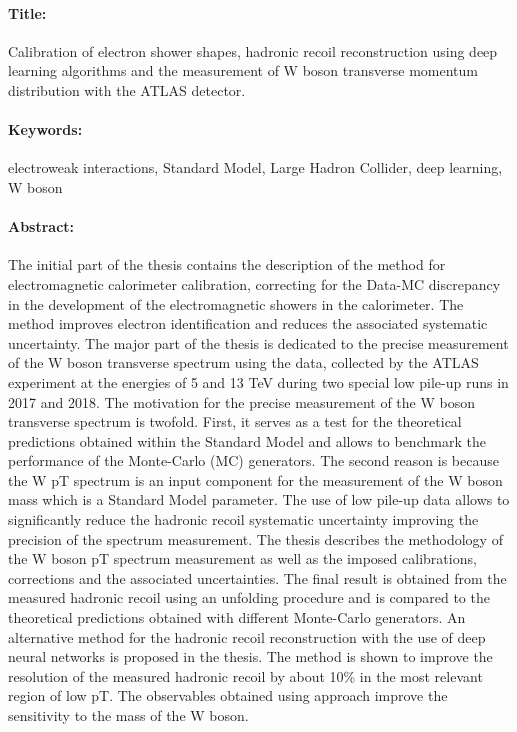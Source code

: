 \begin{mdframed}[linecolor=Prune,linewidth=1]
\vspace{-.25cm}
\paragraph*{Title:} Calibration of electron shower shapes, hadronic recoil reconstruction using deep learning algorithms and the measurement of W boson transverse momentum distribution with the ATLAS detector.

\begin{small}
\vspace{-.25cm}
\paragraph*{Keywords:} electroweak interactions, Standard Model, Large Hadron Collider, deep learning, W boson

\vspace{-.5cm}
\begin{multicols}{2}
\paragraph*{Abstract:} The initial part of the thesis contains the description of the method for electromagnetic calorimeter calibration, correcting for the Data-MC discrepancy in the development of the electromagnetic showers in the calorimeter. The method improves electron identification and reduces the associated systematic uncertainty. 
The major part of the thesis is dedicated to the precise measurement of the W boson transverse spectrum using the data, collected by the ATLAS experiment at the energies of 5 and 13 TeV during two special low pile-up runs in 2017 and 2018. 
The motivation for the precise measurement of the W boson transverse spectrum is twofold. First, it serves as a test for the theoretical predictions obtained within the Standard Model and allows to benchmark the performance of the Monte-Carlo (MC) generators. The second reason is because the W pT spectrum is an input component for the measurement of the W boson mass which is a Standard Model parameter. The use of low pile-up data allows to significantly reduce the hadronic recoil systematic uncertainty improving the precision of the spectrum measurement.
The thesis describes the methodology of the W boson pT spectrum measurement as well as the imposed calibrations, corrections and the associated uncertainties. The final result is obtained from the measured hadronic recoil using an unfolding procedure and is compared to the theoretical predictions obtained with different Monte-Carlo generators. 
An alternative method for the hadronic recoil reconstruction with the use of deep neural networks is proposed in the thesis. The method is shown to improve the resolution of the measured hadronic recoil by about 10\% in the most relevant region of low pT. The observables obtained using approach improve the sensitivity to the mass of the W boson.
\end{multicols}
\end{small}
\end{mdframed}

